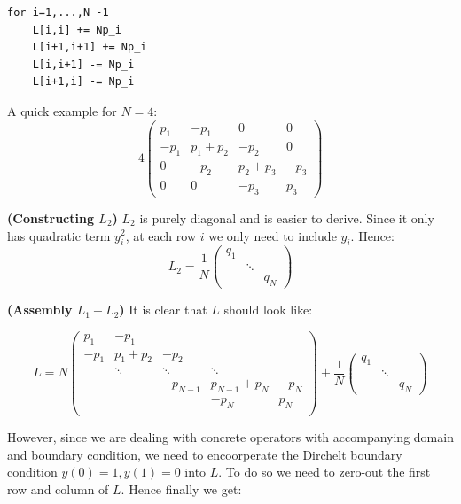 \begin{verbatim}
for i=1,...,N -1
    L[i,i] += Np_i
    L[i+1,i+1] += Np_i
    L[i,i+1] -= Np_i 
    L[i+1,i] -= Np_i
\end{verbatim}

\begin{example}A quick example for $N=4$:
\begin{equation}
4\begin{pmatrix}
p_1 & -p_1 & 0 & 0 \\
-p_1 & p_1+p_2 & -p_2 &0 \\
0 & -p_2 & p_2+p_3 & -p_3 \\
0 &  0 & -p_3  & p_3
\end{pmatrix}
\end{equation}

\end{example}\textbf{(Constructing $L_2$)}
$L_2$ is purely diagonal and is easier to derive. Since it only has quadratic term $y_i^2$, at each row $i$ we only need to include $y_i$. Hence:
\begin{equation}
L_2 = \frac{1}{N}\begin{pmatrix}q_1 & & \\
& \ddots & \\
& & q_N
\end{pmatrix}
\end{equation}

\textbf{(Assembly $L_1+L_2$)}
It is clear that $L$ should look like:

\begin{equation}
L=N\begin{pmatrix}
p_1&  -p_1 & & &  \\
-p_1& p_1+p_2 &  -p_2 & &  \\
&  \ddots  &  \ddots &   \ddots &   \\
&  &-p_{N-1} &p_{N-1}+p_{N} & -p_N  \\
& & &-p_N & p_N \\
\end{pmatrix} 
+ 
\frac{1}{N}\begin{pmatrix}q_1 & & \\
& \ddots & \\
& & q_N
\end{pmatrix}
\end{equation}

However, since we are dealing with concrete operators with accompanying domain and boundary condition, we need to encoorperate the Dirchelt boundary condition $y(0)=1, y(1)=0$ into $L$. To do so we need to zero-out the first row and column of $L$. Hence finally we get:

